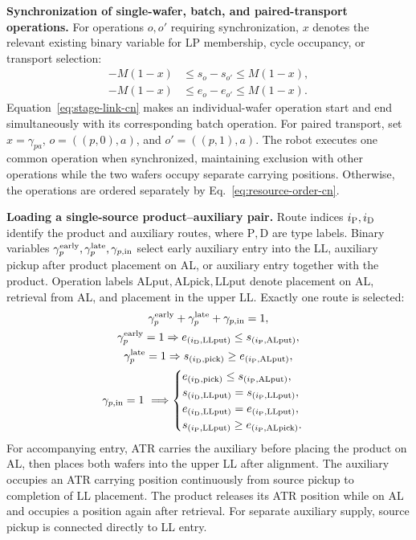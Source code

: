 \documentclass[final,5p,times,twocolumn]{elsarticle}
\begin{document}
\noindent\textbf{Synchronization of single-wafer, batch, and paired-transport operations.}
For operations $o,o'$ requiring synchronization, $x$ denotes the relevant existing binary variable for LP membership, cycle occupancy, or transport selection:
\begin{equation}
\begin{aligned}
-M(1-x)&\le s_o-s_{o'}\le M(1-x),\\
-M(1-x)&\le e_o-e_{o'}\le M(1-x).
\end{aligned}
\label{eq:stage-link-cn}
\end{equation}
Equation~\eqref{eq:stage-link-cn} makes an individual-wafer operation start and end simultaneously with its corresponding batch operation. For paired transport, set $x=\gamma_{pa}$, $o=((p,0),a)$, and $o'=((p,1),a)$. The robot executes one common operation when synchronized, maintaining exclusion with other operations while the two wafers occupy separate carrying positions. Otherwise, the operations are ordered separately by Eq.~\eqref{eq:resource-order-cn}.

\noindent\textbf{Loading a single-source product--auxiliary pair.}
Route indices $i_{\rm P},i_{\rm D}$ identify the product and auxiliary routes, where $\mathrm P,\mathrm D$ are type labels. Binary variables $\gamma^{\rm early}_p,\gamma^{\rm late}_p,\gamma_{p,\mathrm{in}}$ select early auxiliary entry into the LL, auxiliary pickup after product placement on AL, or auxiliary entry together with the product. Operation labels $\mathrm{ALput,ALpick,LLput}$ denote placement on AL, retrieval from AL, and placement in the upper LL. Exactly one route is selected:
\begin{equation}
\begin{gathered}
\gamma^{\rm early}_p+\gamma^{\rm late}_p+\gamma_{p,\mathrm{in}}=1,\\
\gamma^{\rm early}_p=1\Rightarrow e_{(i_{\rm D},\mathrm{LLput})}\le s_{(i_{\rm P},\mathrm{ALput})},\\
\gamma^{\rm late}_p=1\Rightarrow s_{(i_{\rm D},\mathrm{pick})}\ge e_{(i_{\rm P},\mathrm{ALput})},\\
\gamma_{p,\mathrm{in}}=1\ \Longrightarrow
\begin{cases}
e_{(i_{\rm D},\mathrm{pick})}\le s_{(i_{\rm P},\mathrm{ALput})},\\
s_{(i_{\rm D},\mathrm{LLput})}=s_{(i_{\rm P},\mathrm{LLput})},\\
e_{(i_{\rm D},\mathrm{LLput})}=e_{(i_{\rm P},\mathrm{LLput})},\\
s_{(i_{\rm P},\mathrm{LLput})}\ge e_{(i_{\rm P},\mathrm{ALpick})}.
\end{cases}\end{gathered}
\label{eq:single-source-accompany-cn}
\end{equation}
For accompanying entry, ATR carries the auxiliary before placing the product on AL, then places both wafers into the upper LL after alignment. The auxiliary occupies an ATR carrying position continuously from source pickup to completion of LL placement. The product releases its ATR position while on AL and occupies a position again after retrieval. For separate auxiliary supply, source pickup is connected directly to LL entry.
\end{document}
